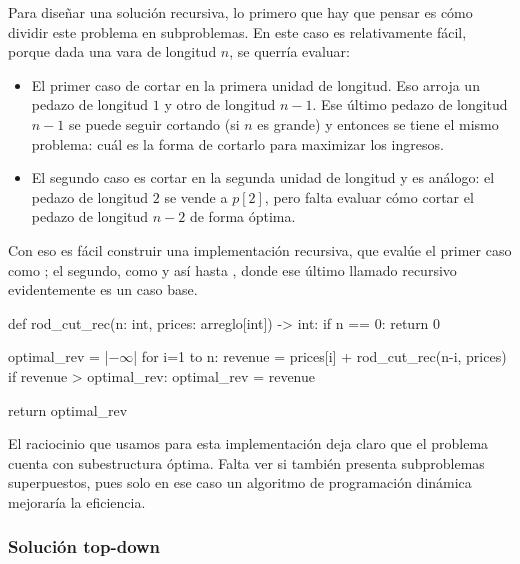 Para diseñar una solución recursiva, lo primero que hay que pensar es cómo dividir este problema en subproblemas. En este caso es relativamente fácil, porque dada una vara de longitud $n$, se querría evaluar:
\begin{itemize}
  \item El primer caso de cortar en la primera unidad de longitud. Eso arroja un pedazo de longitud $1$ y otro de longitud $n-1$. Ese último pedazo de longitud $n-1$ se puede seguir cortando (si $n$ es grande) y entonces se tiene el mismo problema: cuál es la forma de cortarlo para maximizar los ingresos.
  \item El segundo caso es cortar en la segunda unidad de longitud y es análogo: el pedazo de longitud $2$ se vende a $p[2]$, pero falta evaluar cómo cortar el pedazo de longitud $n-2$ de forma óptima.
\end{itemize}
Con eso es fácil construir una implementación recursiva,  que evalúe el primer caso como ; el segundo, como  y así hasta , donde ese último llamado recursivo evidentemente es un caso base.
\begin{pseudocode}
def rod_cut_rec(n: int, prices: arreglo[int]) -> int:
    if n == 0: return 0

    optimal_rev = |$-\infty$|
    for i=1 to n:
        revenue = prices[i] + rod_cut_rec(n-i, prices)
        if revenue > optimal_rev:
            optimal_rev = revenue
    
    return optimal_rev
\end{pseudocode}
El raciocinio que usamos para esta implementación deja claro que el problema cuenta con subestructura óptima. Falta ver si también presenta subproblemas superpuestos, pues solo en ese caso un algoritmo de programación dinámica mejoraría la eficiencia.


\subsubsection{Solución top-down}

